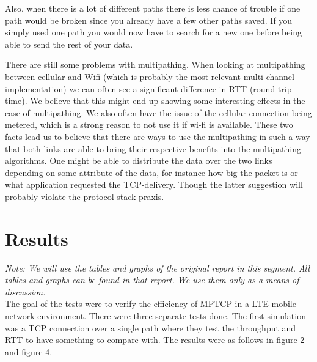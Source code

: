 \documentclass[11pt,twocolumn]{article}
\begin{document}
Also, when there is a lot of different paths there is less chance of trouble if one path would be broken since you already have a few other paths saved. If you simply used one path you would now have to search for a new one before being able to send the rest of your data.

There are still some problems with multipathing. When looking at multipathing between cellular and Wifi (which is probably the most relevant multi-channel implementation) we can often see a significant difference in RTT (round trip time). We believe that this might end up showing some interesting effects in the case of multipathing. We also often have the issue of the cellular connection being metered, which is a strong reason to not use it if wi-fi is available. These two facts lead us to believe that there are ways to use the multipathing in such a way that both links are able to bring their respective benefits into the multipathing algorithms. One might be able to distribute the data over the two links depending on some attribute of the data, for instance how big the packet is or what application requested the TCP-delivery. Though the latter suggestion will probably violate the protocol stack praxis.

\section{Results}

\emph{Note: We will use the tables and graphs of the original report\cite{MPTCP-LTE} in this segment. All tables and graphs can be found in that report. We use them only as a means of discussion.} \\

The goal of the tests were to verify the efficiency of MPTCP in a LTE mobile network environment. There were three separate tests done. The first simulation was a TCP connection over a single path where they test the throughput and RTT to have something to compare with. The results were as follows in figure 2 and figure 4.
\end{document}
